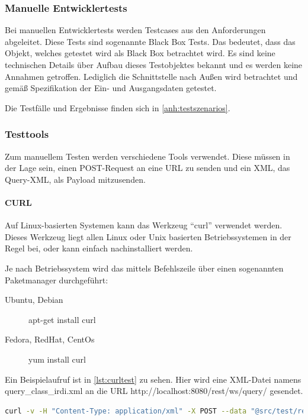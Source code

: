 \subsubsection{Manuelle Entwicklertests}

Bei manuellen Entwicklertests werden Testcases aus den Anforderungen abgeleitet. Diese Tests sind sogenannte Black Box Tests. Das bedeutet, dass das Objekt, welches getestet wird als Black Box betrachtet wird. Es sind keine technischen Details über Aufbau dieses Testobjektes bekannt und es werden keine Annahmen getroffen. Lediglich die Schnittstelle nach Außen wird betrachtet und gemäß Spezifikation der Ein- und Ausgangsdaten getestet. 

Die Testfälle und Ergebnisse finden sich in \autoref{anh:testszenarios}.

\subsubsection{Testtools}

Zum manuellem Testen werden verschiedene Tools verwendet. Diese müssen in der Lage sein, einen POST-Request an eine URL zu senden und ein XML, das Query-XML, als Payload mitzusenden.

\paragraph{CURL}

Auf Linux-basierten Systemen kann das Werkzeug \enquote{curl} verwendet werden. Dieses Werkzeug liegt allen Linux oder Unix basierten Betriebssystemen in der Regel bei, oder kann einfach nachinstalliert werden. 

Je nach Betriebssystem wird das mittels Befehlszeile über einen sogenannten Paketmanager durchgeführt:
\begin{description}
\item[Ubuntu, Debian] apt-get install curl
\item[Fedora, RedHat, CentOs] yum install curl
\end{description}

Ein Beispielaufruf ist in \autoref{lst:curltest} zu sehen. Hier wird eine XML-Datei namens query\_class\_irdi.xml an die URL http://localhost:8080/rest/ws/query/ gesendet. 

\begin{lstlisting}[caption=CURL Test des REST Webservices, language=sh, label=lst:curltest]
curl -v -H "Content-Type: application/xml" -X POST --data "@src/test/resources/de/feu/plib/xml/query_class_irdi.xml" http://localhost:8080/rest/ws/query
 \end{lstlisting}   

